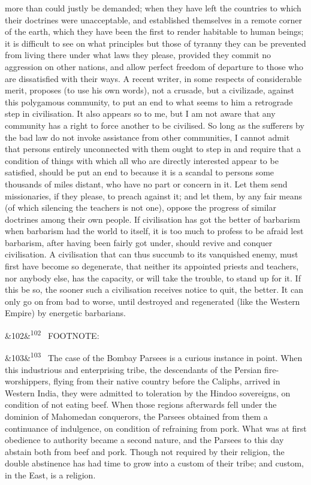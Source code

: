 \documentclass[12pt]{article}
\newcommand{\para}[1][]{\par\noindent\ifx&#1&\else\textsuperscript{\footnotesize #1}~\fi}
\begin{document}
more than could justly be demanded; when they have left the countries to which their doctrines were unacceptable, and established themselves in a remote corner of the earth, which they have been the first to render habitable to human beings; it is difficult to see on what principles but those of tyranny they can be prevented from living there under what laws they please, provided they commit no aggression on other nations, and allow perfect freedom of departure to those who are dissatisfied with their ways. A recent writer, in some respects of considerable merit, proposes (to use his own words), not a crusade, but a civilizade, against this polygamous community, to put an end to what seems to him a retrograde step in civilisation. It also appears so to me, but I am not aware that any community has a right to force another to be civilised. So long as the sufferers by the bad law do not invoke assistance from other communities, I cannot admit that persons entirely unconnected with them ought to step in and require that a condition of things with which all who are directly interested appear to be satisfied, should be put an end to because it is a scandal to persons some thousands of miles distant, who have no part or concern in it. Let them send missionaries, if they please, to preach against it; and let them, by any fair means (of which silencing the teachers is not one), oppose the progress of similar doctrines among their own people. If civilisation has got the better of barbarism when barbarism had the world to itself, it is too much to profess to be afraid lest barbarism, after having been fairly got under, should revive and conquer civilisation. A civilisation that can thus succumb to its vanquished enemy, must first have become so degenerate, that neither its appointed priests and teachers, nor anybody else, has the capacity, or will take the trouble, to stand up for it. If this be so, the sooner such a civilisation receives notice to quit, the better. It can only go on from bad to worse, until destroyed and regenerated (like the Western Empire) by energetic barbarians.

\para[102] FOOTNOTE:

\para[103] The case of the Bombay Parsees is a curious instance in point. When this industrious and enterprising tribe, the descendants of the Persian fire-worshippers, flying from their native country before the Caliphs, arrived in Western India, they were admitted to toleration by the Hindoo sovereigns, on condition of not eating beef. When those regions afterwards fell under the dominion of Mahomedan conquerors, the Parsees obtained from them a continuance of indulgence, on condition of refraining from pork. What was at first obedience to authority became a second nature, and the Parsees to this day abstain both from beef and pork. Though not required by their religion, the double abstinence has had time to grow into a custom of their tribe; and custom, in the East, is a religion.
\end{document}
